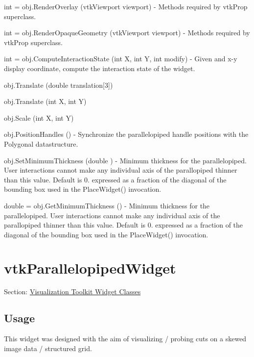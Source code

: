 \begin{DoxyItemize}
\item {\ttfamily int = obj.\-Render\-Overlay (vtk\-Viewport viewport)} -\/ Methods required by vtk\-Prop superclass.  
\item {\ttfamily int = obj.\-Render\-Opaque\-Geometry (vtk\-Viewport viewport)} -\/ Methods required by vtk\-Prop superclass.  
\item {\ttfamily int = obj.\-Compute\-Interaction\-State (int X, int Y, int modify)} -\/ Given and x-\/y display coordinate, compute the interaction state of the widget.  
\item {\ttfamily obj.\-Translate (double translation\mbox{[}3\mbox{]})}  
\item {\ttfamily obj.\-Translate (int X, int Y)}  
\item {\ttfamily obj.\-Scale (int X, int Y)}  
\item {\ttfamily obj.\-Position\-Handles ()} -\/ Synchronize the parallelopiped handle positions with the Polygonal datastructure.  
\item {\ttfamily obj.\-Set\-Minimum\-Thickness (double )} -\/ Minimum thickness for the parallelopiped. User interactions cannot make any individual axis of the parallopiped thinner than this value. Default is 0. expressed as a fraction of the diagonal of the bounding box used in the Place\-Widget() invocation.  
\item {\ttfamily double = obj.\-Get\-Minimum\-Thickness ()} -\/ Minimum thickness for the parallelopiped. User interactions cannot make any individual axis of the parallopiped thinner than this value. Default is 0. expressed as a fraction of the diagonal of the bounding box used in the Place\-Widget() invocation.  
\end{DoxyItemize}\hypertarget{vtkwidgets_vtkparallelopipedwidget}{}\section{vtk\-Parallelopiped\-Widget}\label{vtkwidgets_vtkparallelopipedwidget}
Section\-: \hyperlink{sec_vtkwidgets}{Visualization Toolkit Widget Classes} \hypertarget{vtkwidgets_vtkxyplotwidget_Usage}{}\subsection{Usage}\label{vtkwidgets_vtkxyplotwidget_Usage}
This widget was designed with the aim of visualizing / probing cuts on a skewed image data / structured grid.


